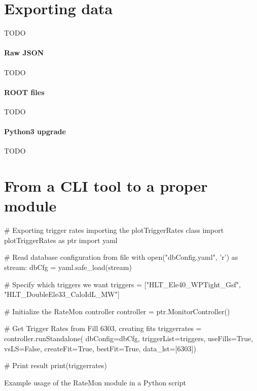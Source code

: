 
\section{Exporting data}

TODO

\paragraph{Raw JSON}

TODO

\paragraph{ROOT files}

TODO

\paragraph{Python3 upgrade}

TODO

\section{From a CLI tool to a proper module}

\begin{listing}[ht]
\begin{pythoncode}
# Exporting trigger rates importing the plotTriggerRates class
import plotTriggerRates as ptr
import yaml

# Read database configuration from file
with open("dbConfig.yaml", 'r') as stream:
    dbCfg = yaml.safe_load(stream)

# Specify which triggers we want
triggers = ["HLT_Ele40_WPTight_Gsf",
              "HLT_DoubleEle33_CaloIdL_MW"]

# Initialize the RateMon controller
controller = ptr.MonitorController()

# Get Trigger Rates from Fill 6303, creating fits
triggerrates = controller.runStandalone(
                         dbConfig=dbCfg,
                         triggerList=triggers,
                         useFills=True,
                         vsLS=False,
                         createFit=True,
                         bestFit=True,
                         data_lst=[6303])

# Print result
print(triggerrates)
\end{pythoncode}
\caption{Example usage of the RateMon module in a Python script}
\end{listing}

